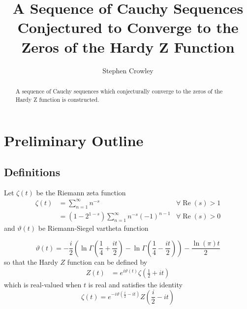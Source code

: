 \documentclass{elsarticle}
\newcommand{\tmop}[1]{\ensuremath{\operatorname{#1}}}
\begin{document}
\title{A Sequence of Cauchy Sequences Conjectured to Converge to the Zeros of the Hardy Z Function}

\author{Stephen Crowley}
\address[add1]{320 East College St}
\address[add2]{Jacksboro, TX 76458}

\begin{abstract}
  A sequence of Cauchy sequences which conjecturally converge to the
  zeros of the Hardy Z function is constructed.
\end{abstract}
\maketitle

\section{Preliminary Outline}

\subsection{Definitions}

Let $\zeta (t)$ be the Riemann zeta function
\begin{equation}
  \begin{array}{lll}
    \zeta (t) & = \sum_{n = 1}^{\infty} n^{- s} & \forall \tmop{Re} (s) > 1\\
    & = (1 - 2^{1 - s}) \sum_{n = 1}^{\infty} n^{- s} (- 1)^{n - 1} & \forall
    \tmop{Re} (s) > 0
  \end{array}
\end{equation}
and $\vartheta (t)$ be Riemann-Siegel vartheta function


\begin{equation}
  \vartheta (t) = - \frac{i}{2} \left( \ln \Gamma \left( \frac{1}{4} + \frac{i
  t}{2} \right) - \ln \Gamma \left( \frac{1}{4} - \frac{i t}{2} \right)
  \right) - \frac{\ln (\pi) t}{2} \label{vartheta}
\end{equation}
so that the Hardy $Z$ function{\cite{HardyZ}} can be defined by
\begin{equation}
  \begin{array}{ll}
    Z (t) & = e^{i \vartheta (t)} \zeta \left( \frac{1}{2} + i t \right)
  \end{array} \label{Z}
\end{equation}
which is real-valued when $t$ is real and satisfies the identity
\begin{equation}
  \zeta (t) = e^{- i \vartheta \left( \frac{i}{2} - i t \right)} Z \left(
  \frac{i}{2} - i t \right) \label{Zz}
\end{equation}
\end{document}
